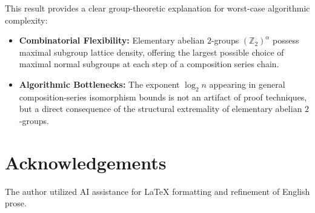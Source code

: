 \documentclass[11pt,a4paper]{article}
\theoremstyle{definition}
\begin{document}
This result provides a clear group-theoretic explanation for worst-case algorithmic complexity:
\begin{itemize}
    \item \textbf{Combinatorial Flexibility:} Elementary abelian $2$-groups $(\mathbb{Z}_2)^\alpha$ possess maximal subgroup lattice density, offering the largest possible choice of maximal normal subgroups at each step of a composition series chain.
    \item \textbf{Algorithmic Bottlenecks:} The exponent $\log_2 n$ appearing in general composition-series isomorphism bounds is not an artifact of proof techniques, but a direct consequence of the structural extremality of elementary abelian $2$-groups.
\end{itemize}

\section*{Acknowledgements}
The author utilized AI assistance for LaTeX formatting and refinement of English prose.
\end{document}
